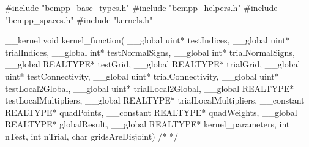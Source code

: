 \begin{opencl}
#include "bempp_base_types.h"
#include "bempp_helpers.h"
#include "bempp_spaces.h"
#include "kernels.h"

__kernel void kernel_function(
    __global uint* testIndices, __global uint* trialIndices,
    __global int* testNormalSigns, __global int* trialNormalSigns,
    __global REALTYPE* testGrid, __global REALTYPE* trialGrid,
    __global uint* testConnectivity, __global uint* trialConnectivity,
    __global uint* testLocal2Global, __global uint* trialLocal2Global,
    __global REALTYPE* testLocalMultipliers, __global REALTYPE* trialLocalMultipliers,
    __constant REALTYPE* quadPoints, __constant REALTYPE* quadWeights,
    __global REALTYPE* globalResult,
    __global REALTYPE* kernel_parameters,
    int nTest, int nTrial, char gridsAreDisjoint)
{
  /* */
}
\end{opencl}

